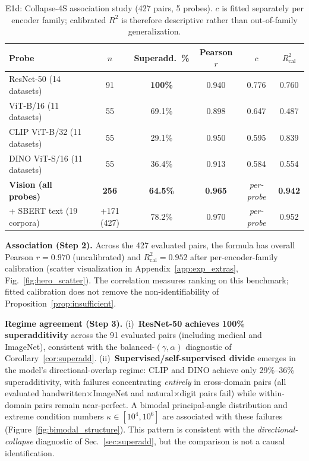 \documentclass{article}
\begin{document}
\begin{table}[h]
\centering
\caption{E1d: Collapse-4S association study (427 pairs, 5 probes).
$c$ is fitted separately per encoder family; calibrated $R^2$ is therefore
descriptive rather than out-of-family generalization.}
\label{tab:e1d}
\small
\setlength{\tabcolsep}{3.5pt}
\begin{tabular}{lccccc}
\toprule
Probe & $n$ & Superadd.\  \% & Pearson $r$ & $c$ & $R^2_{\mathrm{cal}}$ \\
\midrule
ResNet-50 (14 datasets)       & 91  & \textbf{100\%}   & 0.940 & 0.776 & 0.760 \\
ViT-B/16 (11 datasets)        & 55  & 69.1\%            & 0.898 & 0.647 & 0.487 \\
CLIP ViT-B/32 (11 datasets)    & 55  & 29.1\%            & 0.950 & 0.595 & 0.839 \\
DINO ViT-S/16 (11 datasets)    & 55  & 36.4\%            & 0.913 & 0.584 & 0.554 \\
\midrule
\textbf{Vision (all probes)}   & \textbf{256} & \textbf{64.5\%} & \textbf{0.965} & \emph{per-probe} & \textbf{0.942} \\
+ SBERT text (19 corpora)      & +171 (427)   & 78.2\%           & 0.970          & \emph{per-probe} & 0.952 \\
\bottomrule
\end{tabular}\normalsize
\end{table}

\textbf{Association (Step 2).}
Across the 427 evaluated pairs, the formula has
overall Pearson $r{=}0.970$ (uncalibrated) and
$R^2_{\mathrm{cal}}{=}0.952$ after per-encoder-family calibration
(scatter visualization in Appendix~\ref{app:exp_extras}, Fig.~\ref{fig:hero_scatter}).
The correlation measures ranking on this benchmark; fitted calibration does
not remove the non-identifiability of Proposition~\ref{prop:insufficient}.

\textbf{Regime agreement (Step 3).}
(i)~\textbf{ResNet-50 achieves 100\% superadditivity} across the 91 evaluated
pairs (including medical and ImageNet), consistent with the
balanced-$(\gamma,\alpha)$ diagnostic of Corollary~\ref{cor:superadd}.
(ii)~\textbf{Supervised/self-supervised divide} emerges in the model's
directional-overlap regime: CLIP and DINO achieve only 29\%--36\% superadditivity,
with failures concentrating \emph{entirely} in cross-domain pairs
(all evaluated handwritten$\times$ImageNet and natural$\times$digit pairs fail)
while within-domain pairs remain near-perfect.
A bimodal principal-angle distribution and extreme condition numbers
$\kappa{\in}[10^4,10^6]$ are associated with these failures
(Figure~\ref{fig:bimodal_structure}).  This pattern is consistent with the
\emph{directional-collapse} diagnostic of Sec.~\ref{sec:superadd}, but the
comparison is not a causal identification.
\end{document}
